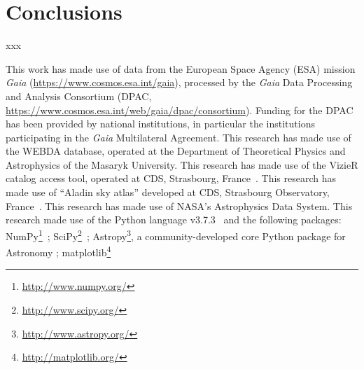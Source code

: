 \documentclass{aa}
\begin{document}
\section{Conclusions}

xxx

\begin{acknowledgements}
This work has made use of data from the European Space Agency (ESA) mission
{\it Gaia} (\url{https://www.cosmos.esa.int/gaia}), processed by the {\it Gaia}
Data Processing and Analysis Consortium (DPAC,
\url{https://www.cosmos.esa.int/web/gaia/dpac/consortium}). Funding for the DPAC
has been provided by national institutions, in particular the institutions
participating in the {\it Gaia} Multilateral Agreement.
%
This research has made use of the WEBDA database, operated at the Department of
Theoretical Physics and Astrophysics of the Masaryk University.
%
This research has made use of the VizieR catalog access tool, operated at CDS,
Strasbourg, France~\citep{Ochsenbein_2000}.
%
This research has made use of ``Aladin sky atlas'' developed at
CDS, Strasbourg Observatory, France~\citep{Bonnarel2000,Boch2014}.
%
This research has made use of NASA's Astrophysics Data System.
%
This research made use of the Python language v3.7.3~\citep{vanRossum_1995}
and the following packages:
NumPy\footnote{\url{http://www.numpy.org/}}~\citep{vanDerWalt_2011};
SciPy\footnote{\url{http://www.scipy.org/}}~\citep{Jones_2001};
Astropy\footnote{\url{http://www.astropy.org/}}, a community-developed core
Python package for Astronomy \citep{Astropy_2013};
matplotlib\footnote{\url{http://matplotlib.org/}}~\citep{hunter_2007}
\end{acknowledgements}





\end{document}
